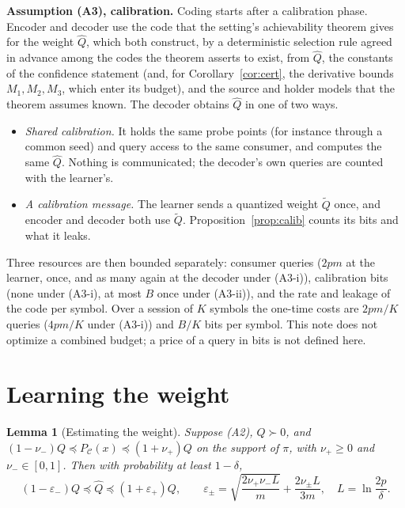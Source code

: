 \documentclass[11pt,onecolumn]{IEEEtran}
\newtheorem{lemma}[theorem]{Lemma}
\newcommand{\PC}{P_{\mathcal C}}
\newcommand{\nup}{\nu_{+}}
\newcommand{\num}{\nu_{-}}
\newcommand{\epp}{\varepsilon_{+}}
\newcommand{\emm}{\varepsilon_{-}}
\begin{document}
\textbf{Assumption (A3), calibration.} Coding starts after a calibration phase. Encoder
and decoder use the code that the setting's achievability theorem gives for the weight
$\hat Q$, which both construct, by a deterministic selection rule agreed in advance among
the codes the theorem asserts to exist, from $\hat Q$, the constants of the confidence
statement (and, for Corollary~\ref{cor:cert}, the derivative bounds $M_1,M_2,M_3$, which
enter its budget), and the source and holder models that the theorem assumes known. The
decoder obtains $\hat Q$ in one of two ways.
\begin{itemize}
\item[(A3-i)] \emph{Shared calibration.} It holds the same probe points (for instance
through a common seed) and query access to the same consumer, and computes the same
$\hat Q$. Nothing is communicated; the decoder's own queries are counted with the
learner's.
\item[(A3-ii)] \emph{A calibration message.} The learner sends a quantized weight
$\tilde Q$ once, and encoder and decoder both use $\tilde Q$. Proposition~\ref{prop:calib}
counts its bits and what it leaks.
\end{itemize}
Three resources are then bounded separately: consumer queries ($2pm$ at the learner,
once, and as many again at the decoder under (A3-i)), calibration bits (none under
(A3-i), at most $B$ once under (A3-ii)), and the rate and leakage of the code per symbol.
Over a session of $K$ symbols the one-time costs are $2pm/K$ queries ($4pm/K$ under
(A3-i)) and $B/K$ bits per symbol. This note does not optimize a combined budget; a price of a
query in bits is not defined here.

\section{Learning the weight}

\begin{lemma}[Estimating the weight]\label{lem:est}
Suppose (A2), $Q\succ0$, and $(1-\num)Q\preceq\PC(x)\preceq(1+\nup)Q$ on the support
of $\pi$, with $\nup\ge0$ and $\num\in[0,1]$. Then with probability at least
$1-\delta$,
\[
(1-\emm)Q\preceq\hat Q\preceq(1+\epp)Q,\qquad
\varepsilon_\pm=\sqrt{\frac{2\nup\num L}m}+\frac{2\nu_\pm L}{3m},\quad L=\ln\frac{2p}\delta .
\]
\end{lemma}
\end{document}
